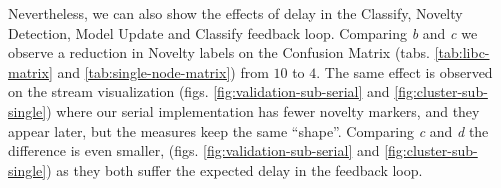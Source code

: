 Nevertheless, we can also show the effects of delay in the
Classify, Novelty Detection, Model Update and Classify feedback loop.
Comparing \emph{b} and \emph{c} we observe a reduction in Novelty labels
on the Confusion Matrix (tabs. \ref{tab:libc-matrix} and \ref{tab:single-node-matrix})
from $10$ to $4$.
The same effect is observed on the stream visualization (figs.
\ref{fig:validation-sub-serial} and \ref{fig:cluster-sub-single}) where our
serial implementation has fewer novelty markers, and they appear later, but the
measures keep the same ``shape''.
Comparing \emph{c} and \emph{d} the difference is even smaller,
(figs. \ref{fig:validation-sub-serial} and \ref{fig:cluster-sub-single})
as they both suffer the expected delay in the feedback loop.



%     
%     


%   

